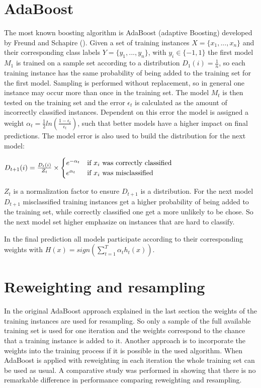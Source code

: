 \documentclass[10pt]{reportMaster}
\begin{document}
\section{AdaBoost}
The most known boosting algorithm is AdaBoost (adaptive Boosting) developed by Freund and Schapire (\cite{boostingIntro}).
Given a set of training instances $X = \{x_1, ..., x_n\}$ and their corresponding class labels $Y = \{y_1, ..., y_n\}$, with $y_i \in \{-1, 1\}$ the first model $M_1$ is trained on a sample set according to a distribution $D_1(i) = \frac{1}{n}$, so each training instance has the same probability of being added to the training set for the first model.
Sampling is performed without replacement, so in general one instance may occur more than once in the training set.
The model $M_t$ is then tested on the training set and the error $\epsilon_t$ is calculated as the amount of incorrectly classified instances.
Dependent on this error the model is assigned a weight $\alpha_t = \frac{1}{2} ln(\frac{1 - \epsilon_t}{\epsilon_t})$, such that better models have a higher impact on final predictions.
The model error is also used to build the distribution for the next model: 

$ D_{t+1}(i) = \frac{D_t(i)}{Z_t} \times 
\begin{cases}
	e^{-\alpha_t} & \text{if $ x_i $ was correctly classified} \\ 
	e^{\alpha_t} & \text{if $ x_i $ was misclassified}
\end{cases}
$

$Z_t$ is a normalization factor to ensure $D_{t+1}$ is a distribution.
For the next model $D_{t+1}$ misclassified training instances get a higher probability of being added to the training set, while correctly classified one get a more unlikely to be chose.
So the next model set higher emphasize on instances that are hard to classify.

In the final prediction all models participate according to their corresponding weights with $H(x) = sign(\sum_{t = 1}^T\alpha_th_t(x))$.


\section{Reweighting and resampling}
In the original AdaBoost approach explained in the last section the weights of the training instances are used for resampling.
So only a sample of the full available training set is used for one iteration and the weights correspond to the chance that a training instance is added to it.
Another approach is to incorporate the weights into the training process if it is possible in the used algorithm.
When AdaBoost is applied with reweighting in each iteration the whole training set can be used as usual.
A comparative study was performed in \cite{resamplingReweighting} showing that there is no remarkable difference in performance comparing reweighting and resampling.
\end{document}
